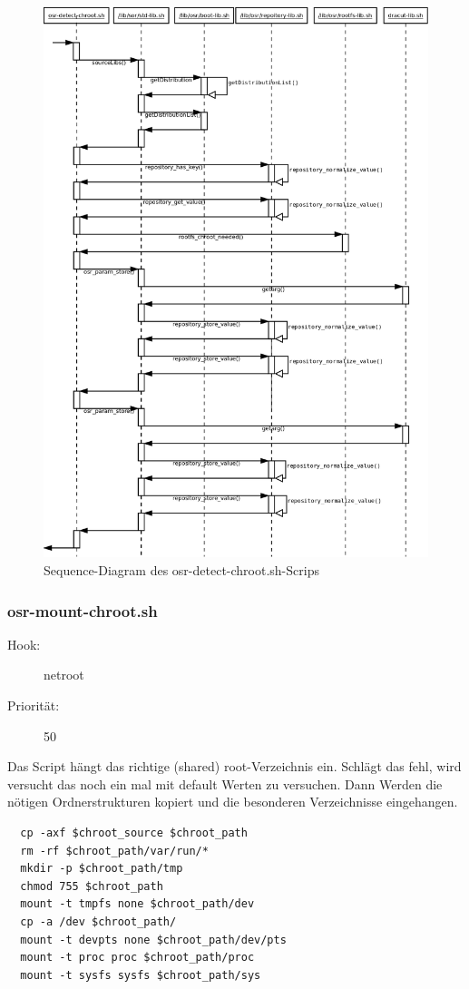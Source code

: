 \documentclass[10pt,a4paper]{article}
\begin{document}
\begin{figure}[H]
 \centering
 \includegraphics[width=1.0\textwidth,height=1.0\textwidth]{./sequence_diagram_osr-detect-chroot_DE_de.png}
 \caption[]{Sequence-Diagram des osr-detect-chroot.sh-Scrips}
\end{figure}

\subsubsection{osr-mount-chroot.sh}
\label{osrmountchroot} 

\begin{description}
\item[Hook:] netroot
\item[Priorität:] 50
\end{description}

Das Script hängt das richtige (shared) root-Verzeichnis ein. Schlägt das fehl, wird versucht das noch ein mal mit default Werten zu versuchen. Dann Werden die nötigen Ordnerstrukturen kopiert und die besonderen Verzeichnisse eingehangen.

\begin{verbatim}
  cp -axf $chroot_source $chroot_path
  rm -rf $chroot_path/var/run/*
  mkdir -p $chroot_path/tmp
  chmod 755 $chroot_path
  mount -t tmpfs none $chroot_path/dev
  cp -a /dev $chroot_path/
  mount -t devpts none $chroot_path/dev/pts
  mount -t proc proc $chroot_path/proc
  mount -t sysfs sysfs $chroot_path/sys
\end{verbatim}
\end{document}
